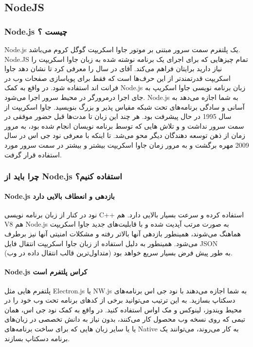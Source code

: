 \subsection{NodeJS}
\subsubsection{Node.js چیست ؟}
Node.js یک پلتفرم سمت سرور مبتنی بر موتور جاوا اسکریپت گوگل کروم
 می‌باشد. Node.JS تمام چیزهایی که برای اجرای یک برنامه نوشته شده به زبان جاوا اسکریپت را نیاز دارید برایتان فراهم می‌کند. آقای
  در سال
 را معرفی کرد تا نشان دهد جاوا اسکریپت قدرتمند‌تر از این حرف‌ها است که فقط برای پویاسازی صفحات وب در فرانت اند استفاده شود. در واقع به کمک Node.js زبان برنامه نویسی جاوا اسکریپ به جای اجرا درمرورگر در محیط سرور اجرا می‌شود. Node.js به شما اجازه می‌دهد به آسانی و سادگی برنامه‌های تحت شبکه مقیاس پذیر و بزرگ بنویسید.
جاوا اسکریپت از سال 1995 در حال پیشرفت بود. هر چند این زبان تا مدت‌ها قبل حضور موفقی در سمت سرور نداشت و و تلاش هایی که توسط برنامه نویسان انجام شده بود، به مرور زمان از ذهن توسعه دهندگان دیگر محو می‌شد. تا اینکه با معرفی نود جی اس در سال 2009 مهره برگشت و به مرور زمان جاوا اسکریپت بیشتر و بیشتر در سمت سرور مورد استفاده قرار گرفت.

\subsubsection{چرا باید از Node.js استفاده کنیم؟}
\paragraph{Node.js بازدهی و انعطاف بالایی دارد}
نود در کنار
 از زبان برنامه نویسی C++ استفاده کرده و سرعت بسیار بالایی دارد. هم V8 هم Node.js به صورت مرتب آپدیت شده و با قابلیت‌های جدید جاوا اسکریپت هماهنگ می‌شوند، همینطور بازدهی آنها بالاتر رفته و مشکلات امنیتی آنها نیز برطرف می‌شود. همینطور به دلیل استفاده از زبان جاوا اسکریپت انتقال فایل JSON (متداول‌ترین قالب انتقال داده در وب) به طور پیش فرض بسیار سریع خواهد بود.

\paragraph{Node.js کراس پلتفرم است}
پلتفرم هایی مثل Electron.js یا NW.js به شما اجازه می‌دهند با نود جی اس برنامه‌های دسکتاپ بسازید. به این ترتیب می‌توانید برخی از کدهای برنامه تحت وب خود را در محیط ویندوز، لینوکس و مک اواس استفاده کنید. در واقع به کمک نود جی اس، همان تیمی که روی نسخه وب محصول کار می‌کنند، بدون نیاز به دانش تخصصی در زبان‌های
 یا
  یا سایر زبان هایی که برای ساخت برنامه‌های Native به کار می‌روند، می‌توانند یک برنامه دسکتاپ بسازند.

